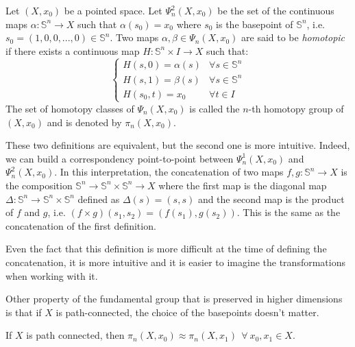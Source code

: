 \documentclass[12pt]{article}
\begin{document}
\begin{definition}
	Let \((X, x_0)\) be a pointed space. Let \(\Psi_n^2(X, x_0)\) be the set of the continuous maps \(\alpha : \mathbb{S}^n \rightarrow X\) such that \(\alpha(s_0) = x_0\) where \(s_0\) is the basepoint of \(\mathbb{S}^n\), i.e. \(s_0 = (1, 0, 0, ..., 0) \in \mathbb{S}^n\). Two maps \(\alpha, \beta \in \Psi_n(X, x_0)\) are said to be \textit{homotopic} if there exists a continuous map \(H : \mathbb{S}^n \times I \rightarrow X\) such that:
	\[
		\begin{cases}
			H(s, 0) = \alpha(s) & \forall s \in \mathbb{S}^n \\
			H(s, 1) = \beta(s) & \forall s \in \mathbb{S}^n \\
			H(s_0, t) = x_0 & \forall t \in I
		\end{cases}
	\]
	The set of homotopy classes of \(\Psi_n(X, x_0)\) is called the \(n\)-th homotopy group of \((X, x_0)\) and is denoted by \(\pi_n(X, x_0)\).
\end{definition}

These two definitions are equivalent, but the second one is more intuitive. Indeed, we can build a correspondency point-to-point between \(\Psi_n^1(X, x_0)\) and \(\Psi_n^2(X, x_0)\). In this interpretation, the concatenation of two maps \(f, g : \mathbb{S}^n \rightarrow X\) is the composition \(\mathbb{S}^n \rightarrow \mathbb{S}^n \times \mathbb{S}^n \rightarrow X\) where the first map is the diagonal map \(\Delta : \mathbb{S}^n \rightarrow \mathbb{S}^n \times \mathbb{S}^n\) defined as \(\Delta(s) = (s, s)\) and the second map is the product of \(f\) and \(g\), i.e. \((f \times g)(s_1, s_2) = (f(s_1), g(s_2))\). This is the same as the concatenation of the first definition.


Even the fact that this definition is more difficult at the time of defining the concatenation, it is more intuitive and it is easier to imagine the transformations when working with it.

Other property of the fundamental group that is preserved in higher dimensions is that if \(X\) is path-connected, the choice of the basepoints doesn't matter.

\begin{proposition}
	If \(X\) is path connected, then \(\pi_n(X, x_0) \approx \pi_n(X, x_1) \ \ \forall \ x_0, x_1 \in X\).
\end{proposition}
\end{document}
